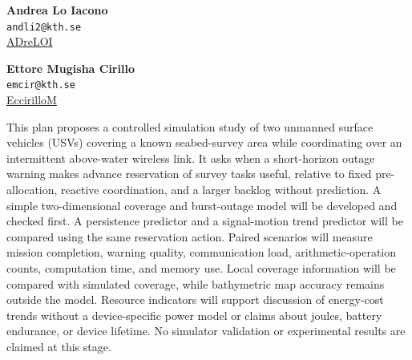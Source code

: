 {\small
\noindent\begin{minipage}[t]{0.48\linewidth}
\centering
\textbf{Andrea Lo Iacono}\\
\texttt{andli2@kth.se}\\
\mbox{\href{https://github.com/ADreLOI}{\color{black}{\faGithubSquare}\hspace*{0.13cm}ADreLOI}}
\end{minipage}\hfill
\begin{minipage}[t]{0.48\linewidth}
\centering
\textbf{Ettore Mugisha Cirillo}\\
\texttt{emcir@kth.se}\\
\mbox{\href{https://github.com/EccirilloM}{\color{black}{\faGithubSquare}\hspace*{0.13cm}EccirilloM}}
\end{minipage}\par
\vspace{4pt}
\noindent{}\par
}
\vspace{2pt}

This plan proposes a controlled simulation study of two unmanned surface vehicles (USVs) covering a known seabed-survey area while coordinating over an intermittent above-water wireless link. It asks when a short-horizon outage warning makes advance reservation of survey tasks useful, relative to fixed pre-allocation, reactive coordination, and a larger backlog without prediction. A simple two-dimensional coverage and burst-outage model will be developed and checked first. A persistence predictor and a signal-motion trend predictor will be compared using the same reservation action. Paired scenarios will measure mission completion, warning quality, communication load, arithmetic-operation counts, computation time, and memory use. Local coverage information will be compared with simulated coverage, while bathymetric map accuracy remains outside the model. Resource indicators will support discussion of energy-cost trends without a device-specific power model or claims about joules, battery endurance, or device lifetime. No simulator validation or experimental results are claimed at this stage.

